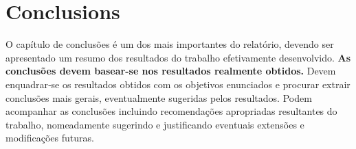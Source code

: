 \chapter{Conclusions} %
\label{chap:conclusions}

O capítulo de conclusões é um dos mais importantes do relatório, devendo ser apresentado um resumo dos resultados do trabalho efetivamente desenvolvido. \textbf{As conclusões devem basear-se nos resultados realmente obtidos.} Devem enquadrar‑se os resultados obtidos com os objetivos enunciados e procurar extrair conclusões mais gerais, eventualmente sugeridas pelos resultados. Podem acompanhar as conclusões incluindo recomendações apropriadas resultantes do trabalho, nomeadamente sugerindo e justificando eventuais extensões e modificações futuras.






